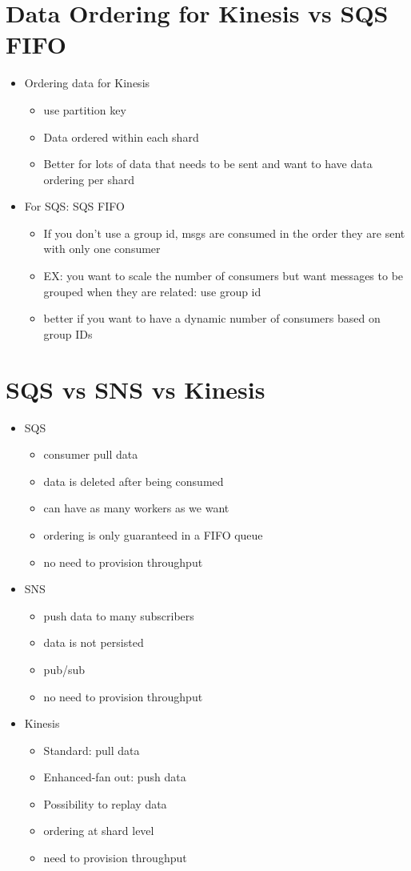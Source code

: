 \documentclass[]{scrartcl}
\begin{document}
\section{Data Ordering for Kinesis vs SQS FIFO}
\begin{itemize}
	\item Ordering data for Kinesis
	\begin{itemize}
		\item use partition key
		\item Data ordered within each shard
		\item Better for lots of data that needs to be sent and want to have data ordering per shard
	\end{itemize}
	\item For SQS: SQS FIFO
	\begin{itemize}
		\item If you don't use a group id, msgs are consumed in the order they are sent with only one consumer
		\item EX: you want to scale the number of consumers but want messages to be grouped when they are related: use group id
		\item better if you want to have a dynamic number of consumers based on group IDs
	\end{itemize}
\end{itemize}

\section{SQS vs SNS vs Kinesis}
\begin{itemize}
	\item SQS
	\begin{itemize}
		\item consumer pull data
		\item data is deleted after being consumed
		\item can have as many workers as we want
		\item ordering is only guaranteed in a FIFO queue
		\item no need to provision throughput
	\end{itemize}
	\item SNS
	\begin{itemize}
		\item push data to many subscribers
		\item data is not persisted
		\item pub/sub
		\item no need to provision throughput
	\end{itemize}
	\item Kinesis
	\begin{itemize}
		\item Standard: pull data
		\item Enhanced-fan out: push data
		\item Possibility to replay data
		\item ordering at shard level
		\item need to provision throughput
	\end{itemize}
\end{itemize}
\end{document}
